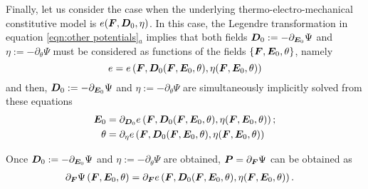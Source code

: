 Finally, let us consider the case when the underlying thermo-electro-mechanical constitutive model is $e(\boldsymbol{F},\boldsymbol{D}_0,\eta)$.
In this case, the Legendre transformation in equation \eqref{eqn:other potentials}$_a$ implies that both fields
$\boldsymbol{D}_0:=-\partial_{\boldsymbol{E}_0}\Psi$ and $\eta:=-\partial_{\theta}\Psi$ must be considered as functions of the fields $\{\boldsymbol{F},\boldsymbol{E}_0,\theta\}$, namely
%
\begin{equation}\label{eqn:change of variable for e}
	e=e\left(\boldsymbol{F},\boldsymbol{D}_0(\boldsymbol{F},\boldsymbol{E}_0,\theta),\eta(\boldsymbol{F},\boldsymbol{E}_0,\theta)\right)
\end{equation}
%
and then, $\boldsymbol{D}_0:=-\partial_{\boldsymbol{E}_0}\Psi$ and $\eta:=-\partial_{\theta}\Psi$ are simultaneously implicitly solved from these equations
%
\begin{equation}
	\begin{aligned}
	\boldsymbol{E}_0&=\partial_{\boldsymbol{D}_0}e\left(\boldsymbol{F},\boldsymbol{D}_0(\boldsymbol{F},\boldsymbol{E}_0,\theta),\eta(\boldsymbol{F},\boldsymbol{E}_0,\theta)\right);\\
			\theta&=\partial_{\eta}e\left(\boldsymbol{F},\boldsymbol{D}_0(\boldsymbol{F},\boldsymbol{E}_0,\theta),\eta(\boldsymbol{F},\boldsymbol{E}_0,\theta)\right)
	\end{aligned}
\end{equation}

Once $\boldsymbol{D}_0:=-\partial_{\boldsymbol{E}_0}\Psi$ and $\eta:=-\partial_{\theta}\Psi$ are obtained, $\boldsymbol{P}=\partial_{\boldsymbol{F}}\Psi$ can be obtained as
%
\begin{equation}
	\begin{aligned}
		\partial_{\boldsymbol{F}}\Psi\left(\boldsymbol{F},\boldsymbol{E}_0,\theta\right)&=\partial_{\boldsymbol{F}}e\left(\boldsymbol{F},\boldsymbol{D}_0(\boldsymbol{F},\boldsymbol{E}_0,\theta),\eta(\boldsymbol{F},\boldsymbol{E}_0,\theta)\right).
	\end{aligned}
\end{equation}

